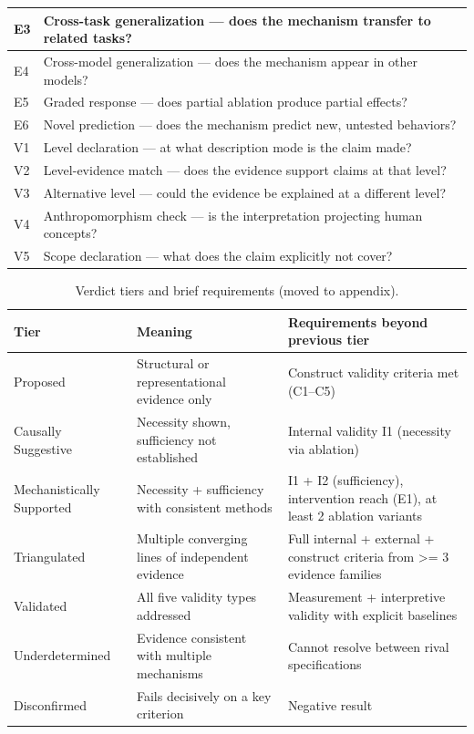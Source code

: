 \documentclass[10pt]{article}
\begin{document}
\begin{table}[p]
\begin{tabular}{|l|p{}|}
\hline
E3 & Cross-task generalization --- does the mechanism transfer to related tasks? \\
\hline
E4 & Cross-model generalization --- does the mechanism appear in other models? \\
\hline
E5 & Graded response --- does partial ablation produce partial effects? \\
\hline
E6 & Novel prediction --- does the mechanism predict new, untested behaviors? \\
\hline
V1 & Level declaration --- at what description mode is the claim made? \\
\hline
V2 & Level-evidence match --- does the evidence support claims at that level? \\
\hline
V3 & Alternative level --- could the evidence be explained at a different level? \\
\hline
V4 & Anthropomorphism check --- is the interpretation projecting human concepts? \\
\hline
V5 & Scope declaration --- what does the claim explicitly not cover? \\
\hline
\end{tabular}
\end{table}
\endgroup

\begin{table}[p]
\centering
\small
\caption{Verdict tiers and brief requirements (moved to appendix).}
\label{tab:verdicts_app}
\renewcommand{\arraystretch}{1.06}
\begin{tabular}{|p{2.5cm}|p{4.5cm}|p{5.0cm}|}
\hline
\textbf{Tier} & \textbf{Meaning} & \textbf{Requirements beyond previous tier} \\
\hline
Proposed & Structural or representational evidence only & Construct validity criteria met (C1--C5) \\
\hline
Causally Suggestive & Necessity shown, sufficiency not established & Internal validity I1 (necessity via ablation) \\
\hline
Mechanistically Supported & Necessity + sufficiency with consistent methods & I1 + I2 (sufficiency), intervention reach (E1), at least 2 ablation variants \\
\hline
Triangulated & Multiple converging lines of independent evidence & Full internal + external + construct criteria from >= 3 evidence families \\
\hline
Validated & All five validity types addressed & Measurement + interpretive validity with explicit baselines \\
\hline
Underdetermined & Evidence consistent with multiple mechanisms & Cannot resolve between rival specifications \\
\hline
Disconfirmed & Fails decisively on a key criterion & Negative result \\
\hline
\end{tabular}
\end{table}
\end{document}

